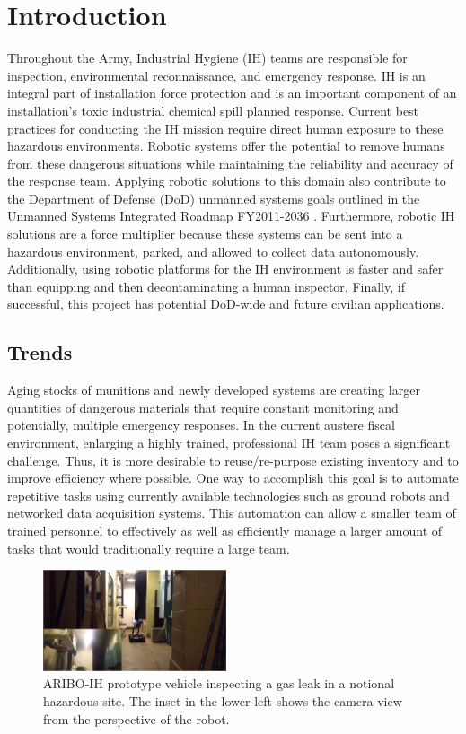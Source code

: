\section{Introduction}\label{sec:introduction}

Throughout the Army, Industrial Hygiene (IH) teams are responsible for inspection, environmental reconnaissance, and emergency response. IH is an integral part of installation force protection and is an important component of an installation’s toxic industrial chemical spill planned response. Current best practices for conducting the IH mission require direct human exposure to these hazardous environments. Robotic systems offer the potential to remove humans from these dangerous situations while maintaining the reliability and accuracy of the response team. Applying robotic solutions to this domain also contribute to the Department of Defense (DoD) unmanned systems goals outlined in the Unmanned Systems Integrated Roadmap FY2011-2036 \cite{roadmap}. Furthermore, robotic IH solutions are a force multiplier because these systems can be sent into a hazardous environment, parked, and allowed to collect data autonomously. Additionally, using robotic platforms for the IH environment is faster and safer than equipping and then decontaminating a human inspector. Finally, if successful, this project has potential DoD-wide and future civilian applications. 

\subsection{Trends}

Aging stocks of munitions and newly developed systems are creating larger quantities of dangerous materials that require constant monitoring and potentially, multiple emergency responses. In the current austere fiscal environment, enlarging a highly trained, professional IH team poses a significant challenge. Thus, it is more desirable to reuse/re-purpose existing inventory and to improve efficiency where possible.  One way to accomplish this goal is to automate repetitive tasks using currently available technologies such as ground robots and networked data acquisition systems. This automation can allow a smaller team of trained personnel to effectively as well as efficiently manage a larger amount of tasks that would traditionally require a large team.

\begin{figure}
	\centering
	\includegraphics[width=0.48\textwidth]{./pictures/concept}
	\caption{ARIBO-IH prototype vehicle inspecting a gas leak in a notional hazardous site. The inset in the lower left shows the camera view from the perspective of the robot.}
	\label{fig:concept}
\end{figure}

